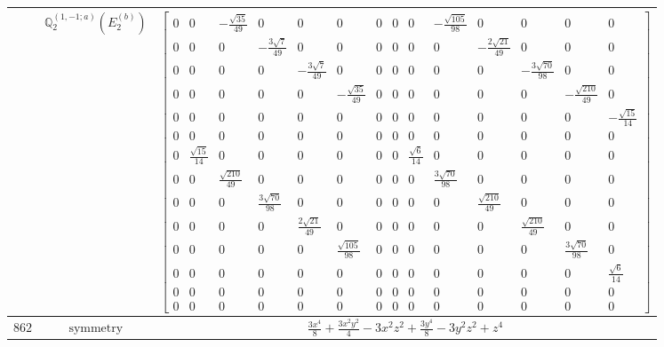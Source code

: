 \documentclass[fleqn,8pt,landscape]{jsarticle}
\begin{document}
\begin{longtable}{ccc}
$  $ & $ \mathbb{Q}_{2}^{(1,-1;a)}(E_{2}^{(b)}) $ & $ \begin{bmatrix} 0 & 0 & - \frac{\sqrt{35}}{49} & 0 & 0 & 0 & 0 & 0 & 0 & - \frac{\sqrt{105}}{98} & 0 & 0 & 0 & 0 \\ 0 & 0 & 0 & - \frac{3 \sqrt{7}}{49} & 0 & 0 & 0 & 0 & 0 & 0 & - \frac{2 \sqrt{21}}{49} & 0 & 0 & 0 \\ 0 & 0 & 0 & 0 & - \frac{3 \sqrt{7}}{49} & 0 & 0 & 0 & 0 & 0 & 0 & - \frac{3 \sqrt{70}}{98} & 0 & 0 \\ 0 & 0 & 0 & 0 & 0 & - \frac{\sqrt{35}}{49} & 0 & 0 & 0 & 0 & 0 & 0 & - \frac{\sqrt{210}}{49} & 0 \\ 0 & 0 & 0 & 0 & 0 & 0 & 0 & 0 & 0 & 0 & 0 & 0 & 0 & - \frac{\sqrt{15}}{14} \\ 0 & 0 & 0 & 0 & 0 & 0 & 0 & 0 & 0 & 0 & 0 & 0 & 0 & 0 \\ 0 & \frac{\sqrt{15}}{14} & 0 & 0 & 0 & 0 & 0 & 0 & \frac{\sqrt{6}}{14} & 0 & 0 & 0 & 0 & 0 \\ 0 & 0 & \frac{\sqrt{210}}{49} & 0 & 0 & 0 & 0 & 0 & 0 & \frac{3 \sqrt{70}}{98} & 0 & 0 & 0 & 0 \\ 0 & 0 & 0 & \frac{3 \sqrt{70}}{98} & 0 & 0 & 0 & 0 & 0 & 0 & \frac{\sqrt{210}}{49} & 0 & 0 & 0 \\ 0 & 0 & 0 & 0 & \frac{2 \sqrt{21}}{49} & 0 & 0 & 0 & 0 & 0 & 0 & \frac{\sqrt{210}}{49} & 0 & 0 \\ 0 & 0 & 0 & 0 & 0 & \frac{\sqrt{105}}{98} & 0 & 0 & 0 & 0 & 0 & 0 & \frac{3 \sqrt{70}}{98} & 0 \\ 0 & 0 & 0 & 0 & 0 & 0 & 0 & 0 & 0 & 0 & 0 & 0 & 0 & \frac{\sqrt{6}}{14} \\ 0 & 0 & 0 & 0 & 0 & 0 & 0 & 0 & 0 & 0 & 0 & 0 & 0 & 0 \\ 0 & 0 & 0 & 0 & 0 & 0 & 0 & 0 & 0 & 0 & 0 & 0 & 0 & 0 \end{bmatrix} $ \\ \hline
$ 862 $ & $ \text{symmetry} $ & $ \frac{3 x^{4}}{8} + \frac{3 x^{2} y^{2}}{4} - 3 x^{2} z^{2} + \frac{3 y^{4}}{8} - 3 y^{2} z^{2} + z^{4} $ \\

\end{longtable}
\end{document}
